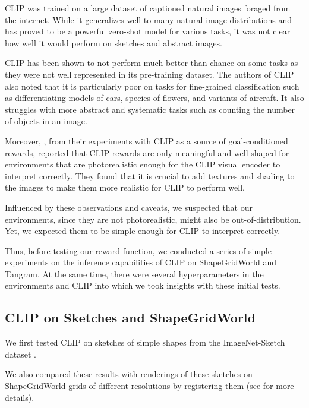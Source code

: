 CLIP was trained on a large dataset of captioned natural images foraged from the internet.
While it generalizes well to many natural-image distributions and has proved to be a powerful zero-shot model for various tasks, it was not clear how well it would perform on sketches and abstract images. 

CLIP has been shown to not perform much better than chance on some tasks as they were not well represented in its pre-training dataset.
The authors of CLIP also noted that it is particularly poor on tasks for fine-grained classification such as differentiating models of cars, species of flowers, and variants of aircraft.
It also struggles with more abstract and systematic tasks such as counting the number of objects in an image.

Moreover, \cite{vlmrm}, from their experiments with CLIP as a source of goal-conditioned rewards, reported that CLIP rewards are only meaningful and well-shaped for environments that are photorealistic enough for the CLIP visual encoder to interpret correctly.
They found that it is crucial to add textures and shading to the images to make them more realistic for CLIP to perform well.

Influenced by these observations and caveats, we suspected that our environments, since they are not photorealistic, might also be out-of-distribution. 
Yet, we expected them to be simple enough for CLIP to interpret correctly.

Thus, before testing our reward function, we conducted a series of simple experiments on the inference capabilities of CLIP on ShapeGridWorld and Tangram.
At the same time, there were several hyperparameters in the environments and CLIP into which we took insights with these initial tests.


\subsection{CLIP on Sketches and ShapeGridWorld}
\label{sec:clip-sketches}

We first tested CLIP on sketches of simple shapes from the ImageNet-Sketch dataset \citep{imagenet}.

We also compared these results with renderings of these sketches on ShapeGridWorld grids of different resolutions by registering them (see  for more details).

